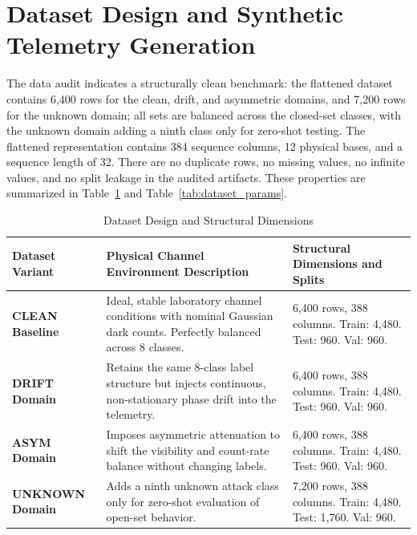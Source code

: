 \section{Dataset Design and Synthetic Telemetry Generation}
The data audit indicates a structurally clean benchmark: the flattened dataset contains 6,400 rows for the clean, drift, and asymmetric domains, and 7,200 rows for the unknown domain; all sets are balanced across the closed-set classes, with the unknown domain adding a ninth class only for zero-shot testing. The flattened representation contains 384 sequence columns, 12 physical bases, and a sequence length of 32. There are no duplicate rows, no missing values, no infinite values, and no split leakage in the audited artifacts. These properties are summarized in Table~\ref{tab:dataset_design} and Table~\ref{tab:dataset_params}.
\begin{table}[!htbp]
\centering
\caption{TF-QKD Dataset Variations and Attack Distributions}
\label{tab:dataset_params}
\small
{}
\end{table}
\begin{table}[!t]
\centering
\caption{Dataset Design and Structural Dimensions}
\label{tab:dataset_design}
\small
\begin{tabular}{@{}p{2.6cm}p{8.1cm}p{4.4cm}@{}}
\toprule
\textbf{Dataset Variant} & \textbf{Physical Channel Environment Description} & \textbf{Structural Dimensions and Splits} \\
\midrule
\textbf{CLEAN Baseline} & Ideal, stable laboratory channel conditions with nominal Gaussian dark counts. Perfectly balanced across 8 classes. & 6,400 rows, 388 columns. Train: 4,480. Test: 960. Val: 960. \\
\textbf{DRIFT Domain} & Retains the same 8-class label structure but injects continuous, non-stationary phase drift into the telemetry. & 6,400 rows, 388 columns. Train: 4,480. Test: 960. Val: 960. \\
\textbf{ASYM Domain} & Imposes asymmetric attenuation to shift the visibility and count-rate balance without changing labels. & 6,400 rows, 388 columns. Train: 4,480. Test: 960. Val: 960. \\
\textbf{UNKNOWN Domain} & Adds a ninth unknown attack class only for zero-shot evaluation of open-set behavior. & 7,200 rows, 388 columns. Train: 4,480. Test: 1,760. Val: 960. \\
\bottomrule
\end{tabular}
\end{table}
